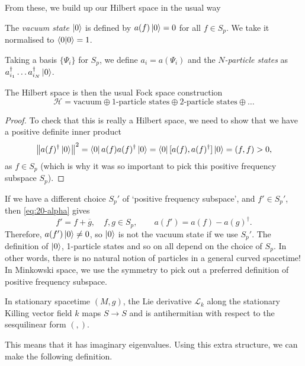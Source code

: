 From these, we build up our Hilbert space in the usual way
\begin{definition}[vacuum]
  The \emph{vacuum state} $\ket{0}$ is defined by $a(f) \ket{0} = 0$ for all $f \in S_p$.
  We take it normalised to $\bra{0}\ket{0} = 1$.
\end{definition}
\begin{definition}[particles]
  Taking a basis $\{\Psi_i\}$ for $S_p$, we define $a_i = a(\Psi_i)$ and the \emph{$N$-particle states} as $a^{\dagger}_{i_1} \dots a^{\dagger}_{i_N} \ket{0}$.
\end{definition}
\begin{claim}
  The Hilbert space is then the usual Fock space construction
  \begin{equation}
    \mathscr{H} = \text{vacuum} \oplus \text{1-particle states} \oplus \text{2-particle states} \oplus \dots
  \end{equation}
\end{claim}
\begin{proof}
  To check that this is really a Hilbert space, we need to show that we have a positive definite inner product
  \begin{equation}
    \norm{a(f)^{\dagger} \ket{0}}^2 = \bra{0} a(f) a(f)^{\dagger} \ket{0} = \bra{0} [a(f), a(f)^{\dagger}] \ket{0} = (f, f) > 0,
  \end{equation}
  as $f \in S_p$ (which is why it was so important to pick this positive frequency subspace $S_p$).
\end{proof}
If we have a different choice $S_p'$ of `positive frequency subspace', and $f' \in S_p'$, then \eqref{eq:20-alpha} gives
\begin{equation}
  f' = f + \overline{g}{}, \quad f, g \in S_p, \qquad a(f') = a(f) - a(g) ^{\dagger}.
\end{equation}
Therefore, $a(f') \ket{0} \neq 0$, so $\ket{0}$ is not the vacuum state if we use $S_p'$.
The definition of $\ket{0}$, 1-particle states and so on all depend on the choice of $S_p$. In other words, there is no natural notion of particles in a general curved spacetime!
In Minkowski space, we use the symmetry to pick out a preferred definition of positive frequency subspace.
\begin{exercise}[Sheet 4]
  In stationary spacetime $(M, g)$, the Lie derivative $\mathcal{L}_k$ along the stationary Killing vector field $k$ maps $S \to S$ and is antihermitian with respect to the sesquilinear form $(, )$.
\end{exercise}
This means that it has imaginary eigenvalues. Using this extra structure, we can make the following definition.
